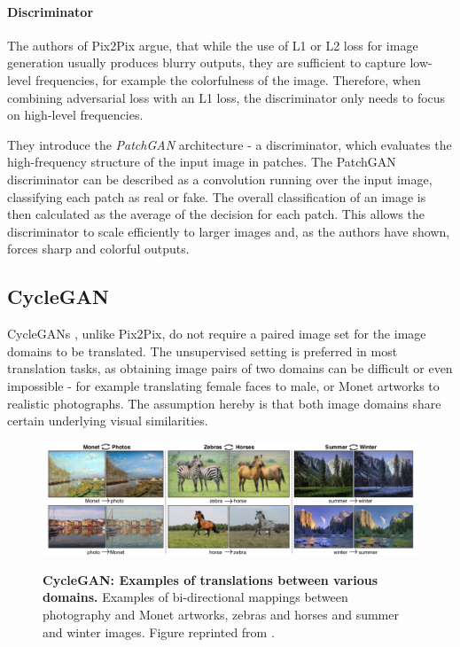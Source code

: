 \documentclass[12pt]{report}
\begin{document}
\paragraph{Discriminator} \label{sec:patchgan}
The authors of Pix2Pix \cite{isola_image--image_2016} argue, that while the use of L1 or L2 loss for image generation usually produces blurry outputs, they are sufficient to capture low-level frequencies, for example the colorfulness of the image. Therefore, when combining adversarial loss with an L1 loss, the discriminator only needs to focus on high-level frequencies. 

They introduce the \textit{PatchGAN} architecture - a discriminator, which evaluates the high-frequency structure of the input image in patches. The PatchGAN discriminator can be described as a convolution running over the input image, classifying each patch as real or fake. The overall classification of an image is then calculated as the average of the decision for each patch. This allows the discriminator to scale efficiently to larger images and, as the authors have shown, forces sharp and colorful outputs.



\pagebreak
\subsection{CycleGAN}
CycleGANs \cite{zhu_unpaired_2017}, unlike Pix2Pix, do not require a paired image set for the image domains to be translated. The unsupervised setting is preferred in most translation tasks, as obtaining image pairs of two domains can be difficult or even impossible - for example translating female faces to male, or Monet artworks to realistic photographs. The assumption hereby is that both image domains share certain underlying visual similarities.

\begin{figure}[h]
\centering
{\includegraphics[width=\linewidth]{03_analysis/gans/cyclegan_example}}
\caption{\label{fig:cyclegan_examples} \textbf{CycleGAN: Examples of translations between various domains.} Examples of bi-directional mappings between photography and Monet artworks, zebras and horses and summer and winter images. Figure reprinted from \cite{zhu_unpaired_2017}.}
\end{figure}
\end{document}
